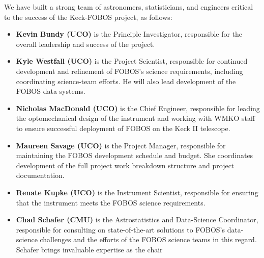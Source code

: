 \documentclass[oneside,11pt]{amsart}
\begin{document}


\begin{center}
\end{center}

\smallskip

\noindent We have built a strong team of astronomers, statisticians, and
engineers critical to the success of the Keck-FOBOS project, as follows:
%
\begin{itemize}
%
\item {\bf Kevin Bundy (UCO)} is the Principle Investigator, responsible
for the overall leadership and success of the project.\\[-5pt]
%
\item {\bf Kyle Westfall (UCO)} is the Project Scientist, responsible
for continued development and refinement of FOBOS's science
requirements, including coordinating science-team efforts.  He will also
lead development of the FOBOS data systems.\\[-5pt]
%
\item {\bf Nicholas MacDonald (UCO)} is the Chief Engineer, responsible
for leading the optomechanical design of the instrument and working with
WMKO staff to ensure successful deployment of FOBOS on the Keck II
telescope.\\[-5pt]
%
\item {\bf Maureen Savage (UCO)} is the Project Manager, responsible for
maintaining the FOBOS development schedule and budget.  She coordinates
development of the full project work breakdown structure and project
documentation.\\[-5pt]
%
\item {\bf Renate Kupke (UCO)} is the Instrument Scientist, responsible
for ensuring that the instrument meets the FOBOS science
requirements.\\[-5pt]
%
\item {\bf Chad Schafer (CMU)} is the Astrostatistics and Data-Science
Coordinator, responsible for consulting on state-of-the-art solutions to
FOBOS's data-science challenges and the efforts of the FOBOS science
teams in this regard.  Schafer brings invaluable expertise as the chair

\end{itemize}
\end{document}

